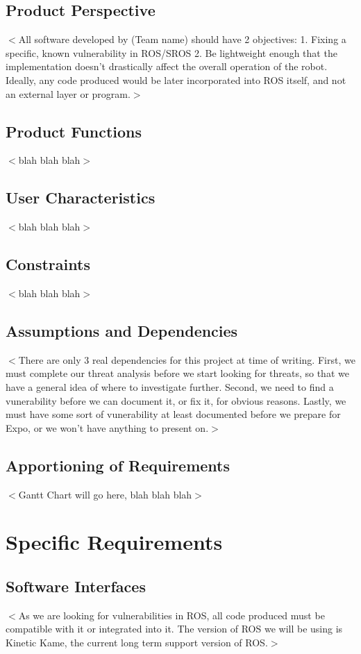 \documentclass{scrreprt}
\begin{document}
\section{Product Perspective}
$<$All software developed by (Team name) should have 2 objectives:
1. Fixing a specific, known vulnerability in ROS/SROS
2. Be lightweight enough that the implementation doesn't drastically affect the overall operation of the robot. Ideally, any code produced would be later incorporated into ROS itself, and not an external layer or program.$>$

\section{Product Functions}
$<$blah blah blah$>$

\section{User Characteristics}
$<$blah blah blah$>$

\section{Constraints}
$<$blah blah blah$>$

\section{Assumptions and Dependencies}
$<$There are only 3 real dependencies for this project at time of writing. First, we must complete our threat analysis before we start looking for threats,
so that we have a general idea of where to investigate further. Second, we need to find a vunerability before we can document it, or fix it, for obvious reasons.
Lastly, we must have some sort of vunerability at least documented before we prepare for Expo, or we won't have anything to present on.$>$

\section{Apportioning of Requirements}
$<$Gantt Chart will go here, blah blah blah$>$


\chapter{Specific Requirements}

\section{Software Interfaces}
$<$As we are looking for vulnerabilities in ROS, all code produced must be compatible with it or integrated into it. The version of ROS we will be using is Kinetic Kame, the current long
term support version of ROS.$>$
\end{document}
